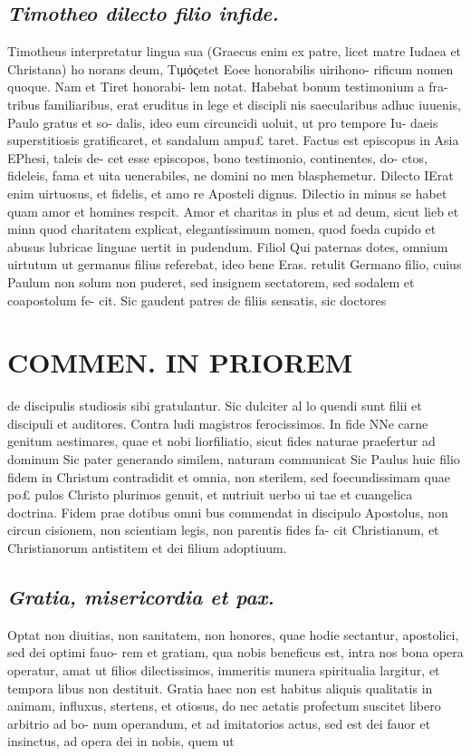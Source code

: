 \documentclass{article}
\begin{document}
\begin{pages}
\subsection*{\textit{Timotheo dilecto filio infide. }}\pstart Timotheus interpretatur lingua sua (Graecus enim ex patre, licet matre Iudaea et Christana) ho norans deum, Τιμόςetet Eoee honorabilis uirihono- rificum nomen quoque. Nam et Tiret honorabi- lem notat. Habebat bonum testimonium a fra- tribus familiaribus, erat eruditus in lege et discipli nis saecularibus adhuc iuuenis, Paulo gratus et so- dalis, ideo eum circuncidi uoluit, ut pro tempore Iu- daeis superstitiosis gratificaret, et sandalum ampu£ taret. Factus est episcopus in Asia EPhesi, taleis de- cet esse episcopos, bono testimonio, continentes, do- ctos, fideleis, fama et uita uenerabiles, ne domini no men blasphemetur.  \pend\pstart Dilecto IErat enim uirtuosus, et fidelis, et amo re Aposteli dignus. Dilectio in minus se habet quam amor et homines respcit. Amor et charitas in plus et ad deum, sicut lieb et minn quod charitatem explicat, elegantissimum nomen, quod foeda cupido et abusus lubricae linguae uertit in pudendum.  \pend\pstart Filiol Qui paternas dotes, omnium uirtutum ut germanus filius referebat, ideo bene Eras. retulit Germano filio, cuius Paulum non solum non puderet, sed insignem sectatorem, sed sodalem et coapostolum fe- cit. Sic gaudent patres de filiis sensatis, sic doctores  \pend
\section*{COMMEN. IN PRIOREM }
\marginpar{[ p.8 ]}\pstart de discipulis studiosis sibi gratulantur. Sic dulciter al lo quendi sunt filii et discipuli et auditores. Contra ludi magistros ferocissimos.  \pend\pstart In fide NNe carne genitum aestimares, quae et nobi liorfiliatio, sicut fides naturae praefertur ad dominum Sic pater generando similem, naturam communicat Sic Paulus huic filio fidem in Christum contradidit et omnia, non sterilem, sed foecundissimam quae po£ pulos Christo plurimos genuit, et nutriuit uerbo ui tae et cuangelica doctrina. Fidem prae dotibus omni bus commendat in discipulo Apostolus, non circun cisionem, non scientiam legis, non parentis fides fa- cit Christianum, et Christianorum antistitem et dei filium adoptiuum.  \pend
{}
{}
\subsection*{\textit{Gratia, misericordia et pax. }}\pstart Optat non diuitias, non sanitatem, non honores, quae hodie sectantur, apostolici, sed dei optimi fauo- rem et gratiam, qua nobis beneficus est, intra nos bona opera operatur, amat ut filios dilectissimos, immeritis munera spiritualia largitur, et tempora libus non destituit. Gratia haec non est habitus aliquis qualitatis in animam, influxus, stertens, et otiosus, do nec aetatis profectum suscitet libero arbitrio ad bo- num operandum, et ad imitatorios actus, sed est dei fauor et insinctus, ad opera dei in nobis, quem ut  \pend

\end{pages}
\end{document}
